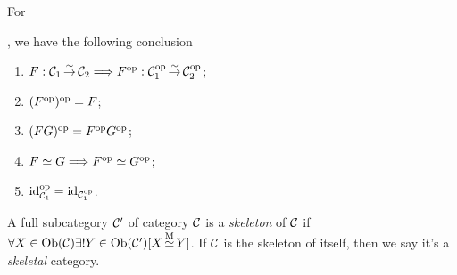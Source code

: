 \documentclass{article}
\begin{document}
\begin{cor}\label{op}
	For , we have the following conclusion
	\begin{enumerate}
		\item $F:\mathcal{C}_1\mathop{\to}\limits^{\sim}\mathcal{C}_2\Longrightarrow F^\mathrm{op}:\mathcal{C}^\mathrm{op}_1\mathop{\to}\limits^{\sim}\mathcal{C}^\mathrm{op}_2$;
		\item $(F^\mathrm{op})^\mathrm{op}=F$;
		\item $(FG)^\mathrm{op}=F^\mathrm{op} G^\mathrm{op}$;
		\item $F\simeq G\Longrightarrow F^\mathrm{op}\simeq G^\mathrm{op}$;
		\item $\mathrm{id}^\mathrm{op}_{\mathcal{C}_1}=\mathrm{id}_{\mathcal{C}^\mathrm{op}_1}$.
	\end{enumerate}
\end{cor}


\begin{defi}\label{skeleton}
	A full subcategory $\mathcal{C}'$ of category $\mathcal{C}$ is a \emph{skeleton} of $\mathcal{C}$ if $\forall X\in\mathrm{Ob}(\mathcal{C})\exists! Y\in\mathrm{Ob}(\mathcal{C}')[X\mathop{\simeq}\limits^\mathrm{M}Y]$. If $\mathcal{C}$ is the skeleton of itself, then we say it's a \emph{skeletal} category.
\end{defi}
\end{document}
